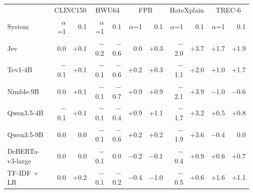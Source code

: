 \begin{tabular}{lrrrrrrrrrr}
\toprule
 & \multicolumn{2}{c}{CLINC150} & \multicolumn{2}{c}{HWU64} & \multicolumn{2}{c}{FPB} & \multicolumn{2}{c}{HateXplain} & \multicolumn{2}{c}{TREC-6} \\
\cmidrule(lr){2-3} \cmidrule(lr){4-5} \cmidrule(lr){6-7} \cmidrule(lr){8-9} \cmidrule(lr){10-11}
System & $\alpha$=1 & 0.1 & $\alpha$=1 & 0.1 & $\alpha$=1 & 0.1 & $\alpha$=1 & 0.1 & $\alpha$=1 & 0.1 \\
\midrule
Jev & 0.0 & +0.1 & $-$0.2 & $-$0.6 & 0.0 & +0.3 & $-$2.0 & +3.7 & +1.7 & +1.9 \\
Tev1-4B & $-$0.1 & +0.1 & $-$0.1 & $-$0.6 & +0.2 & +0.3 & $-$1.1 & +2.0 & +1.0 & +1.7 \\
Nimble-9B & 0.0 & +0.1 & $-$0.1 & $-$0.7 & +0.9 & +0.9 & $-$2.1 & +3.9 & $-$1.0 & $-$0.6 \\
Qwen3.5-4B & $-$0.1 & +0.1 & $-$0.1 & $-$0.4 & +0.9 & +1.1 & $-$1.7 & +3.2 & +0.5 & +0.8 \\
Qwen3.5-9B & 0.0 & 0.0 & $-$0.1 & $-$0.6 & +0.2 & +0.2 & $-$1.9 & +3.6 & $-$0.4 & 0.0 \\
DeBERTa-v3-large & 0.0 & 0.0 & $-$0.1 & 0.0 & $-$0.2 & $-$0.1 & $-$0.4 & +0.9 & +0.6 & +0.7 \\
TF-IDF + LR & 0.0 & +0.2 & $-$0.1 & $-$0.2 & $-$0.4 & $-$1.0 & $-$0.5 & +0.6 & +1.6 & +1.1 \\
\bottomrule
\end{tabular}
